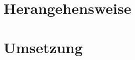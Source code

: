 







\begingroup
\parskip=0pt
\tableofcontents
\endgroup

\clearpage


\clearpage
\section{Herangehensweise}
%
%


\clearpage
\section{Umsetzung}
%

\clearpage


%
%
%

